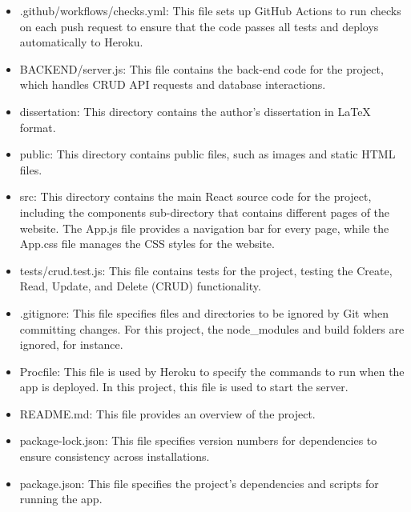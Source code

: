 \begin{itemize}
\item .github/workflows/checks.yml: This file sets up GitHub Actions to run checks on each push request to ensure that the code passes all tests and deploys automatically to Heroku.
\item BACKEND/server.js: This file contains the back-end code for the project, which handles CRUD API requests and database interactions.
\item dissertation: This directory contains the author's dissertation in LaTeX format.
\item public: This directory contains public files, such as images and static HTML files.
\item src: This directory contains the main React source code for the project, including the components sub-directory that contains different pages of the website. The App.js file provides a navigation bar for every page, while the App.css file manages the CSS styles for the website.
\item tests/crud.test.js: This file contains tests for the project, testing the Create, Read, Update, and Delete (CRUD) functionality.
\item .gitignore: This file specifies files and directories to be ignored by Git when committing changes. For this project, the node\_modules and build folders are ignored, for instance.
\item Procfile: This file is used by Heroku to specify the commands to run when the app is deployed. In this project, this file is used to start the server.
\item README.md: This file provides an overview of the project.
\item package-lock.json: This file specifies version numbers for dependencies to ensure consistency across installations.
\item package.json: This file specifies the project's dependencies and scripts for running the app.
\end{itemize}